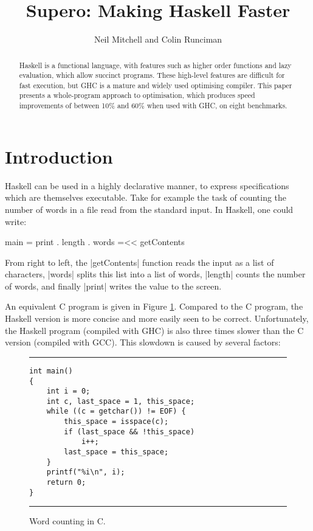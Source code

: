 \documentclass{llncs}
\newenvironment{fig}
    {\begin{figure}[tbp]\hrule}
    {\end{figure}}
\newcommand{\figend}{\hrule}
\begin{document}
\title{Supero: Making Haskell Faster}

\author{Neil Mitchell and Colin Runciman}


\maketitle              %

\begin{abstract}
Haskell is a functional language, with features such as higher order functions and lazy evaluation, which allow succinct programs. These high-level features are difficult for fast execution, but GHC is a mature and widely used optimising compiler. This paper presents a whole-program approach to optimisation, which produces speed improvements of between 10\% and 60\% when used with GHC, on eight benchmarks.
\end{abstract}

\section{Introduction}

Haskell \cite{haskell} can be used in a highly declarative manner, to express specifications which are themselves executable. Take for example the task of counting the number of words in a file read from the standard input. In Haskell, one could write:

\begin{code}
main = print . length . words =<< getContents
\end{code}

From right to left, the |getContents| function reads the input as a list of characters, |words| splits this list into a list of words, |length| counts the number of words, and finally |print| writes the value to the screen.

An equivalent C program is given in Figure \ref{fig:c_words}. Compared to the C program, the Haskell version is more concise and more easily seen to be correct. Unfortunately, the Haskell program (compiled with GHC) is also three times slower than the C version (compiled with GCC). This slowdown is caused by several factors:

\begin{fig}
\bigskip
\begin{verbatim}
int main()
{
	int i = 0;
	int c, last_space = 1, this_space;
	while ((c = getchar()) != EOF) {
		this_space = isspace(c);
		if (last_space && !this_space)
			i++;
		last_space = this_space;
	}
	printf("%i\n", i);
	return 0;
}
\end{verbatim}
\figend
\caption{Word counting in C.}
\label{fig:c_words}
\end{fig}
\end{document}

